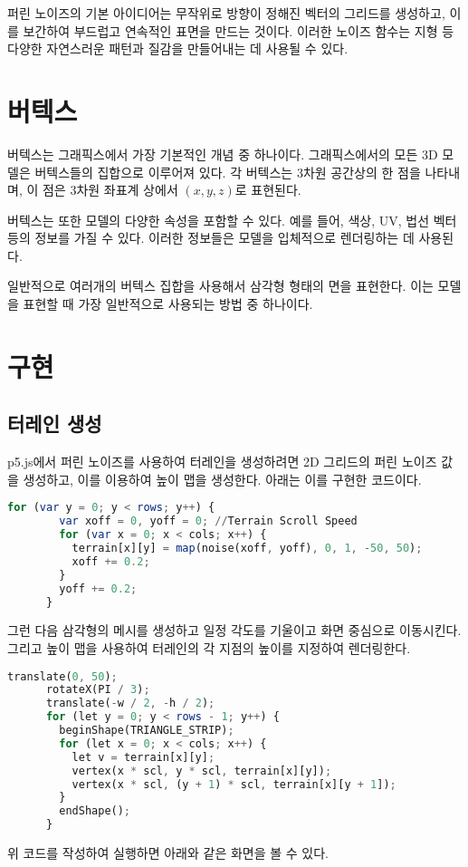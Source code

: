 \documentclass{article}
\begin{document}
퍼린 노이즈의 기본 아이디어는 무작위로 방향이 정해진 벡터의 그리드를 생성하고, 이를 보간하여 부드럽고 연속적인 표면을 만드는 것이다. 이러한 노이즈 함수는 지형 등 다양한 자연스러운 패턴과 질감을 만들어내는 데 사용될 수 있다.

\section{버텍스}

버텍스는 그래픽스에서 가장 기본적인 개념 중 하나이다. 그래픽스에서의 모든 3D 모델은 버텍스들의 집합으로 이루어져 있다. 각 버텍스는 3차원 공간상의 한 점을 나타내며, 이 점은 3차원 좌표계 상에서 $(x, y, z)$로 표현된다.

버텍스는 또한 모델의 다양한 속성을 포함할 수 있다. 예를 들어, 색상, UV, 법선 벡터 등의 정보를 가질 수 있다. 이러한 정보들은 모델을 입체적으로 렌더링하는 데 사용된다.

일반적으로 여러개의 버텍스 집합을 사용해서 삼각형 형태의 면을 표현한다. 이는 모델을 표현할 때 가장 일반적으로 사용되는 방법 중 하나이다.

\section{구현}
    \subsection{터레인 생성}
    p5.js에서 퍼린 노이즈를 사용하여 터레인을 생성하려면 2D 그리드의 퍼린 노이즈 값을 생성하고, 이를 이용하여 높이 맵을 생성한다.
    아래는 이를 구현한 코드이다.
    
    \vspace{30pt}
    \begin{lstlisting}[language=Octave]
      for (var y = 0; y < rows; y++) {
        var xoff = 0, yoff = 0; //Terrain Scroll Speed
        for (var x = 0; x < cols; x++) {
          terrain[x][y] = map(noise(xoff, yoff), 0, 1, -50, 50);
          xoff += 0.2;
        }
        yoff += 0.2;
      }
    \end{lstlisting}
    그런 다음 삼각형의 메시를 생성하고 일정 각도를 기울이고 화면 중심으로 이동시킨다. 그리고 높이 맵을 사용하여 터레인의 각 지점의 높이를 지정하여 렌더링한다.

    \begin{lstlisting}[language=Octave]
      translate(0, 50);
      rotateX(PI / 3);
      translate(-w / 2, -h / 2);
      for (let y = 0; y < rows - 1; y++) {
        beginShape(TRIANGLE_STRIP);
        for (let x = 0; x < cols; x++) {
          let v = terrain[x][y];
          vertex(x * scl, y * scl, terrain[x][y]);
          vertex(x * scl, (y + 1) * scl, terrain[x][y + 1]);
        }
        endShape();
      }
    \end{lstlisting}
    위 코드를 작성하여 실행하면 아래와 같은 화면을 볼 수 있다.
    
\end{document}

